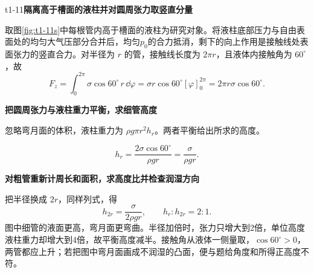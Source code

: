 \begin{drillsolution}{t1-11}\textbf{隔离高于槽面的液柱并对圆周张力取竖直分量}\par\nobreak
取图\ref{fig:t1-11s}中每根管内高于槽面的液柱为研究对象。将液柱底部压力与自由表面处的均匀大气压部分合并后，均匀$p_0$的合力抵消，剩下的向上作用是接触线处表面张力的竖直合力。对半径为 $r$ 的管，接触线长度为 $2\pi r$，且液体内接触角为 $60^\circ$，故
\[
F_z=\int_0^{2\pi}\sigma\cos60^\circ\,r\,\dd\varphi
=\sigma r\cos60^\circ[\varphi]_0^{2\pi}
=2\pi r\sigma\cos60^\circ.
\]


\par\medskip{}\noindent\textbf{把圆周张力与液柱重力平衡，求细管高度}\par\nobreak
忽略弯月面的体积，液柱重力为 $\rho g\pi r^2h_r$。两者平衡给出所求的高度。

\[\boxed{h_r=\frac{2\sigma\cos60^\circ}{\rho gr}=\frac{\sigma}{\rho gr}}.\]


\par\medskip{}\noindent\textbf{对粗管重新计周长和面积，求高度比并检查润湿方向}\par\nobreak
把半径换成 $2r$，同样列式，得
\[\boxed{h_{2r}=\frac{\sigma}{2\rho gr},\qquad h_r:h_{2r}=2:1}.\]
图中细管的液面更高，弯月面更弯曲。半径加倍时，张力只增大到2倍，单位高度液柱重力却增大到4倍，故平衡高度减半。接触角从液体一侧量取，$\cos60^\circ>0$，两管都应上升；若把图中弯月面画成不润湿的凸面，便与题给角度和所得正高度不符。
\end{drillsolution}
